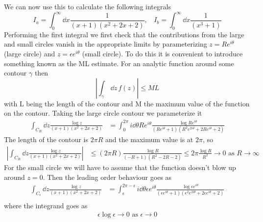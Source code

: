 \documentclass[a4paper,12pt]{article}
\begin{document}
 We can now use this to calculate the following integrals
\begin{equation}
I_a=\int_0^\infty \dd x \frac{1}{(x+1)(x^2+2x+2)},~~~~I_b=\int_0^\infty\dd x \frac{1}{(x^3+1)}
\end{equation}
Performing the first integral we first check that the contributions from the large and small circles vanish in the appropriate limits by parameterizing $z=Re^{i\theta}$ (large circle) and $z=\epsilon e^{i\theta}$ (small circle). To do this it is convenient to introduce something known as the ML estimate. For an analytic function around some contour $\gamma$ then 
\begin{equation}
\left|\int_\gamma\,\dd z\, f(z)\right|\leq M L
\end{equation}
with L being the length of the contour and M the maximum value of the function on the contour. Taking the large circle contour we parameterize it
\begin{equation}
\begin{aligned}
\int_{C_R} \dd z \frac{\log z}{(x+1)(x^2+2x+2)}&=\int_{0}^{2\pi} i\dd \theta R e^{i\theta} \frac{\log Re^{i\theta}}{(Re^{i\theta}+1)(R^2e^{2i\theta}+2Re^{i\theta}+2)}
\end{aligned}
\end{equation}
The length of the contour is $2\pi R$ and the maximum value is at $2\pi$, so
\begin{equation}
	\begin{aligned}
	 \left|\int_{C_R} \dd z \frac{\log z}{(x+1)(x^2+2x+2)}\right|&\leq(2\pi R)
	 \frac{\log R}{(-R+1)(R^2-2R-2)}\leq2\pi \frac{\log R}{R^2}\to 0 \text{ as } R\to\infty
	\end{aligned}
\end{equation}
For the small circle we will have to assume that the function doesn't blow up around $z=0$. Then the leading order behaviour goes as
\begin{equation}
	\begin{aligned}
		\int_{C_\epsilon} \dd z \frac{\log z}{(x+1)(x^2+2x+2)}&=\int_{\epsilon}^{2\pi-\epsilon} i\dd \theta \epsilon e^{i\theta} \frac{\log \epsilon e^{i\theta}}{(\epsilon e^{i\theta}+1)(\epsilon ^2e^{2i\theta}+2\epsilon e^{i\theta}+2)}\\
			\end{aligned}
	\end{equation}
where the integrand goes as
\begin{equation}
	\begin{aligned}
 \epsilon\log \epsilon \to 0 \text{ as }\epsilon\to 0
	\end{aligned}
\end{equation}
\end{document}
